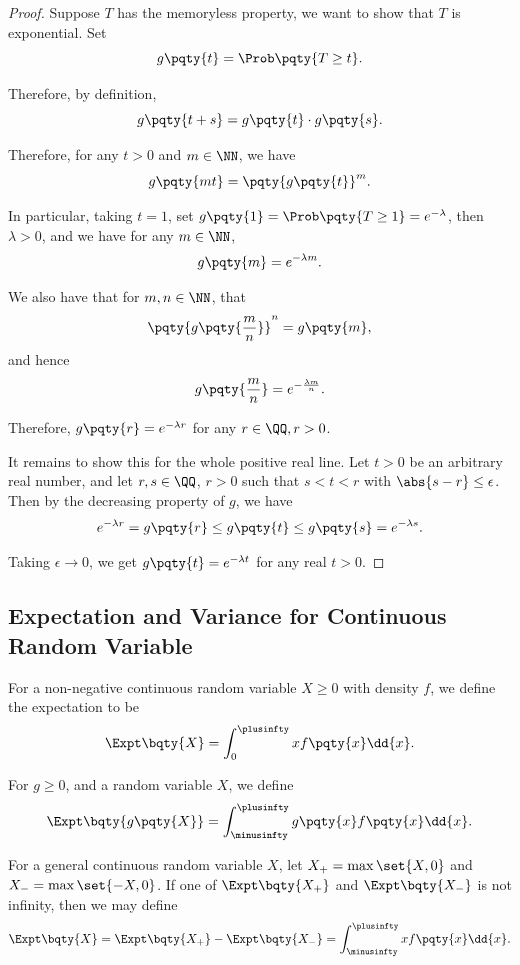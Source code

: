 \begin{proof}
    Suppose \(T\) has the memoryless property, we want to show that \(T\) is exponential. Set
    \[
        g\pqty{t} = \Prob\pqty{T \geq t}.
    \]

    Therefore, by definition,
    \[
        g\pqty{t + s} = g\pqty{t} \cdot g\pqty{s}.
    \]

    Therefore, for any \(t > 0\) and \(m \in \NN\), we have
    \[
        g\pqty{mt} = \pqty{g\pqty{t}}^m.
    \]

    In particular, taking \(t = 1\), set \(g\pqty{1} = \Prob\pqty{T \geq 1} = e^{-\lambda}\), then \(\lambda > 0\), and we have for any \(m \in \NN\),
    \[
        g\pqty{m} = e^{-\lambda m}.
    \]

    We also have that for \(m, n \in \NN\), that
    \[
        \pqty{g\pqty{\frac{m}{n}}}^{n} = g\pqty{m},
    \]
    and hence
    \[
        g\pqty{\frac{m}{n}} = e^{- \frac{\lambda m}{n}}.
    \]

    Therefore, \(g\pqty{r} = e^{-\lambda r}\) for any \(r \in \QQ, r > 0\).

    It remains to show this for the whole positive real line. Let \(t > 0\) be an arbitrary real number, and let \(r, s \in \QQ\), \(r > 0\) such that \(s < t < r\) with \(\abs{s - r} \leq \epsilon\). Then by the decreasing property of \(g\), we have
    \[
        e^{-\lambda r} = g\pqty{r} \leq g\pqty{t} \leq g\pqty{s} = e^{-\lambda s}.
    \]

    Taking \(\epsilon \to 0\), we get \(g\pqty{t} = e^{-\lambda t}\) for any real \(t > 0\).
\end{proof}

\subsection{Expectation and Variance for Continuous Random Variable}

\begin{definition}
    \label{def:expectation-continuous}%
    For a non-negative continuous random variable \(X \geq 0\) with density \(f\), we define the expectation to be
    \[
        \Expt\bqty{X} = \int_{0}^{\plusinfty} x f\pqty{x} \dd{x}.
    \]

    For \(g \geq 0\), and a random variable \(X\), we define
    \[
        \Expt\bqty{g\pqty{X}} = \int_{\minusinfty}^{\plusinfty} g\pqty{x} f\pqty{x} \dd{x}.
    \]

    For a general continuous random variable \(X\), let \(X_+ = \max\set{X, 0}\) and \(X_- = \max\set{-X, 0}\). If one of \(\Expt\bqty{X_+}\) and \(\Expt\bqty{X_-}\) is not infinity, then we may define
    \[
        \Expt\bqty{X} = \Expt\bqty{X_+} - \Expt\bqty{X_-} = \int_{\minusinfty}^{\plusinfty} x f\pqty{x} \dd{x}.
    \]  
\end{definition}

